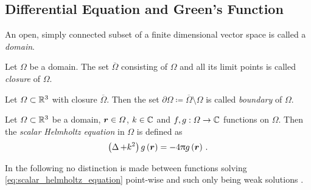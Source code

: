 


\subsection{Differential Equation and Green's Function}

\begin{definition}[Domain]
	An open, simply connected subset of a finite dimensional vector space is called a \emph{domain}.
\end{definition}

\begin{definition}[Closure]
	Let $\Omega$ be a domain. The set $\overline{\Omega}$ consisting of $\Omega$ and all its limit points is called \emph{closure} of $\Omega$.
\end{definition}

\begin{definition}[Boundary]
	Let $\Omega \subset \mathbb{R}^3$ with closure $\overline{\Omega}$. Then the set $\partial\Omega \coloneqq \overline{\Omega}\setminus\Omega$  is called \emph{boundary} of $\Omega$.
\end{definition}

\begin{definition}
	\label{def:helmholtz_equation}
	Let $\Omega \subset \mathbb{R}^3$ be a domain, $\robs \in \Omega$, $k \in \mathbb{C}$ and $f, g: \Omega \rightarrow \mathbb{C}$ functions on $\Omega$. Then the \emph{scalar Helmholtz equation} in $\Omega$ is defined as \cite[p. 282]{Jackson2013}
	\begin{equation}\label{eq:scalar_helmholtz_equation}
		\left(\laplace + k^2\right)g\left(\robs\right) = -4\pi g\left(\robs\right) \, .
	\end{equation}
\end{definition}

\begin{remark}
	In the following no distinction is made between functions solving \eqref{eq:scalar_helmholtz_equation} point-wise and such only being weak solutions \cite[S.~22ff]{Strichartz2003}.
\end{remark}

